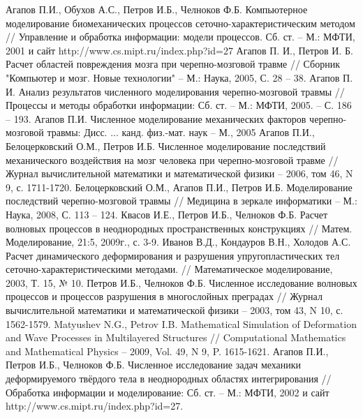 \begin{thebibliography}{99}
 Агапов П.И., Обухов А.С., Петров И.Б., Челноков Ф.Б. Компьютерное моделирование биомеханических процессов сеточно-характеристическим методом // Управление и обработка информации: модели процессов. Сб. ст. – М.: МФТИ, 2001 и сайт http://www.cs.mipt.ru/index.php?id=27
 Агапов П. И., Петров И. Б. Расчет областей повреждения мозга при черепно-мозговой травме // Сборник "Компьютер и мозг. Новые технологии" – М.: Наука, 2005, С. 28 – 38.
 Агапов П. И. Анализ результатов численного моделирования черепно-мозговой травмы // Процессы и методы обработки информации: Сб. ст. – М.: МФТИ, 2005. – С. 186 – 193.
 Агапов П.И. Численное моделирование механических факторов черепно-мозговой травмы: Дисс. ... канд. физ.-мат. наук – М., 2005
Агапов П.И., Белоцерковский О.М., Петров И.Б. Численное моделирование последствий механического воздействия на мозг человека при черепно-мозговой травме // Журнал вычислительной математики и математической физики – 2006, том 46, N 9, с. 1711-1720.
 Белоцерковский О.М., Агапов П.И., Петров И.Б. Моделирование последствий черепно-мозговой травмы // Медицина в зеркале информатики – М.: Наука, 2008, С. 113 – 124.
Квасов И.Е., Петров И.Б., Челноков Ф.Б. Расчет волновых процессов в неоднородных пространственных конструкциях // Матем. Моделирование, 21:5, 2009г., с. 3-9.
Иванов В.Д., Кондауров В.Н., Холодов А.С. Расчет динамического деформирования и разрушения упругопластических тел сеточно-характеристическими методами. // Математическое моделирование, 2003, Т. 15, № 10.
Петров И.Б., Челноков Ф.Б. Численное исследование волновых процессов и процессов разрушения в многослойных преградах // Журнал вычислительной математики и математической физики – 2003, том 43, N 10, с. 1562-1579.
Matyushev N.G., Petrov I.B. Mathematical Simulation of Deformation and Wave Processes in Multilayered Structures // Computational Mathematics and Mathematical Physics – 2009, Vol. 49, N 9, P. 1615-1621.
 Агапов П.И., Петров И.Б., Челноков Ф.Б. Численное исследование задач механики деформируемого твёрдого тела в неоднородных областях интегрирования // Обработка информации и моделирование: Сб. ст. – М.: МФТИ, 2002 и сайт http://www.cs.mipt.ru/index.php?id=27.


\end{thebibliography}
